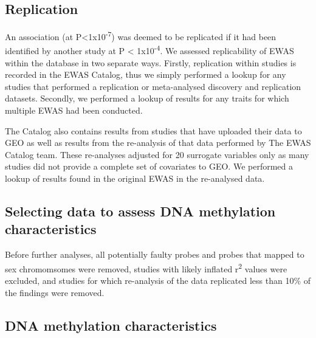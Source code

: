 \documentclass[11pt,oneside]{bristolthesis}
\begin{document}
\hypertarget{replication}{%
\subsection{Replication}\label{replication}}

An association (at P\textless1x10\textsuperscript{-7}) was deemed to be replicated if it had been identified by another study at P \textless{} 1x10\textsuperscript{-4}. We assessed replicability of EWAS within the database in two separate ways. Firstly, replication within studies is recorded in the EWAS Catalog, thus we simply performed a lookup for any studies that performed a replication or meta-analysed discovery and replication datasets. Secondly, we performed a lookup of results for any traits for which multiple EWAS had been conducted.

The Catalog also contains results from studies that have uploaded their data to GEO as well as results from the re-analysis of that data performed by The EWAS Catalog team. These re-analyses adjusted for 20 surrogate variables only as many studies did not provide a complete set of covariates to GEO. We performed a lookup of results found in the original EWAS in the re-analysed data.

\hypertarget{selecting-data-to-assess-dna-methylation-characteristics}{%
\subsection{Selecting data to assess DNA methylation characteristics}\label{selecting-data-to-assess-dna-methylation-characteristics}}

Before further analyses, all potentially faulty probes and probes that mapped to sex chromomsomes were removed, studies with likely inflated r\textsuperscript{2} values were excluded, and studies for which re-analysis of the data replicated less than 10\% of the findings were removed.

\hypertarget{dna-methylation-characteristics}{%
\subsection{DNA methylation characteristics}\label{dna-methylation-characteristics}}
\end{document}
